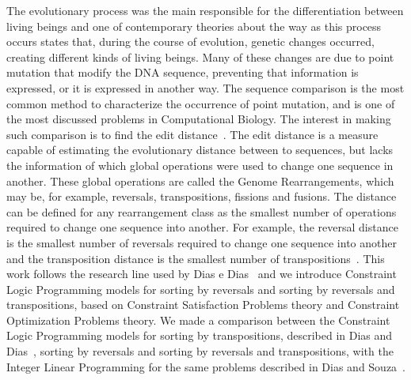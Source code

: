The evolutionary process was the main responsible for the
differentiation between living beings and one of contemporary theories
about the way as this process occurs states that, during the course of
evolution, genetic changes occurred, creating different kinds of
living beings. Many of these changes are due to point mutation that
modify the DNA sequence, preventing that information is expressed, or
it is expressed in another way. The sequence comparison is the most
common method to characterize the occurrence of point mutation, and is
one of the most discussed problems in Computational Biology. The
interest in making such comparison is to find the edit
distance~\cite{SetubalMeidanis*1997}. The edit distance is a measure
capable of estimating the evolutionary distance between to sequences,
but lacks the information of which global operations were used to
change one sequence in another. These global operations are called the
Genome Rearrangements, which may be, for example, reversals,
transpositions, fissions and fusions. The distance can be defined for
any rearrangement class as the smallest number of operations required
to change one sequence into another. For example, the reversal
distance is the smallest number of reversals required to change one
sequence into another~\cite{BafnaPevzner*1996} and the transposition
distance is the smallest number of
transpositions~\cite{BafnaPevzner*1998}. This work follows the
research line used by Dias e Dias~\cite{DiasDias*2009} and we
introduce Constraint Logic Programming models for sorting by reversals
and sorting by reversals and transpositions, based on Constraint
Satisfaction Problems theory and Constraint Optimization Problems
theory. We made a comparison between the Constraint Logic Programming
models for sorting by transpositions, described in Dias and
Dias~\cite{DiasDias*2009}, sorting by reversals and sorting by
reversals and transpositions, with the Integer Linear Programming for
the same problems described in Dias and Souza~\cite{DiasSouza*2007}.

